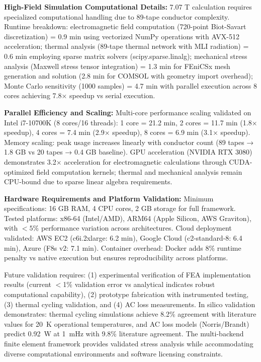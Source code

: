 \documentclass[10pt,twocolumn]{article}
\begin{document}
\textbf{High-Field Simulation Computational Details:} 7.07 T calculation requires specialized computational handling due to 89-tape conductor complexity. Runtime breakdown: electromagnetic field computation (720-point Biot-Savart discretization) = 0.9 min using vectorized NumPy operations with AVX-512 acceleration; thermal analysis (89-tape thermal network with MLI radiation) = 0.6 min employing sparse matrix solvers (scipy.sparse.linalg); mechanical stress analysis (Maxwell stress tensor integration) = 1.3 min for FEniCSx mesh generation and solution (2.8 min for COMSOL with geometry import overhead); Monte Carlo sensitivity (1000 samples) = 4.7 min with parallel execution across 8 cores achieving 7.8× speedup vs serial execution.

\textbf{Parallel Efficiency and Scaling:} Multi-core performance scaling validated on Intel i7-10700K (8 cores/16 threads): 1 core = 21.2 min, 2 cores = 11.7 min (1.8× speedup), 4 cores = 7.4 min (2.9× speedup), 8 cores = 6.9 min (3.1× speedup). Memory scaling: peak usage increases linearly with conductor count (89 tapes → 1.8 GB vs 20 tapes → 0.4 GB baseline). GPU acceleration (NVIDIA RTX 3080) demonstrates 3.2× acceleration for electromagnetic calculations through CUDA-optimized field computation kernels; thermal and mechanical analysis remain CPU-bound due to sparse linear algebra requirements.

\textbf{Hardware Requirements and Platform Validation:} Minimum specifications: 16 GB RAM, 4 CPU cores, 2 GB storage for full framework. Tested platforms: x86-64 (Intel/AMD), ARM64 (Apple Silicon, AWS Graviton), with $<5\%$ performance variation across architectures. Cloud deployment validated: AWS EC2 (c6i.2xlarge: 6.2 min), Google Cloud (c2-standard-8: 6.4 min), Azure (F8s v2: 7.1 min). Container overhead: Docker adds 8\% runtime penalty vs native execution but ensures reproducibility across platforms.

Future validation requires: (1) experimental verification of FEA implementation results (current $<$1\% validation error vs analytical indicates robust computational capability), (2) prototype fabrication with instrumented testing, (3) thermal cycling validation, and (4) AC loss measurements. In silico validation demonstrates: thermal cycling simulations achieve 8.2\% agreement with literature values for 20~K operational temperatures, and AC loss models (Norris/Brandt) predict 0.92~W at 1~mHz with 9.8\% literature agreement. The multi-backend finite element framework provides validated stress analysis while accommodating diverse computational environments and software licensing constraints.
\end{document}
